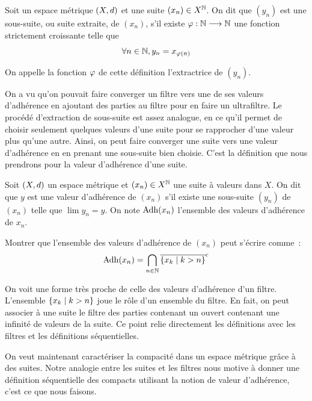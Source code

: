 \begin{definition}
  Soit un espace métrique $(X,d)$ et une suite $(x_n)\in X^{\mathbb N}$. On dit
  que $(y_n)$ est une sous-suite, ou suite extraite, de $(x_n)$, s'il existe
  $\varphi : \displaystyle \mathbb N \longrightarrow \mathbb N$ une fonction strictement croissante telle
  que
  \[\forall n \in \mathbb N, y_n = x_{\varphi(n)}\]

  \noindent
  On appelle la fonction $\varphi$ de cette définition l'extractrice de
  $(y_n)$.
\end{definition}

On a vu qu'on pouvait faire converger un filtre vers une de ses valeurs
d'adhérence en ajoutant des parties au filtre pour en faire un ultrafiltre.
Le procédé d'extraction de sous-suite est assez analogue, en ce qu'il permet
de choisir seulement quelques valeurs d'une suite pour se rapprocher d'une
valeur plus qu'une autre. Ainsi, on peut faire converger une suite vers une
valeur d'adhérence en en prenant une sous-suite bien choisie. C'est la
définition que nous prendrons pour la valeur d'adhérence d'une suite.

\begin{definition}
  Soit $(X,d)$ un espace métrique et $(x_n)\in X^{\mathbb N}$ une suite à
  valeurs dans $X$. On dit que $y$ est une valeur d'adhérence de $(x_n)$ s'il
  existe une sous-suite $(y_n)$ de $(x_n)$ telle que $\lim y_n = y$. On
  note $\operatorname{Adh}(x_n)$ l'ensemble des valeurs d'adhérence de $x_n$.
\end{definition}

\begin{exercise}\label{exo.adh.fil.metr}
  Montrer que l'ensemble des valeurs d'adhérence de $(x_n)$ peut s'écrire
  comme~:
  \[\operatorname{Adh}(x_n) = \bigcap_{n \in \mathbb N} \overline{\left\{ x_k \;\middle\vert\; k > n \right\}}^{\mathrm c}\]
\end{exercise}

\begin{remark}
  On voit une forme très proche de celle des valeurs d'adhérence d'un filtre.
  L'ensemble $\left\{ x_k \;\middle\vert\; k > n \right\}$ joue le rôle d'un ensemble du filtre. En
  fait, on peut associer à une suite le filtre des parties contenant un ouvert
  contenant une infinité de valeurs de la suite. Ce point relie directement
  les définitions avec les filtres et les définitions séquentielles.
\end{remark}

On veut maintenant caractériser la compacité dans un espace métrique grâce à des
suites. Notre analogie entre les suites et les filtres nous motive à donner une
définition séquentielle des compacts utilisant la notion de valeur d'adhérence,
c'est ce que nous faisons.


